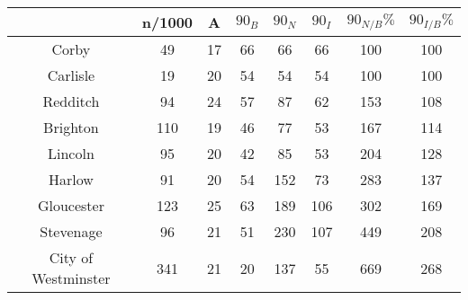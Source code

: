 \begin{tabular}{c|ccccccc}
& n/1000 & A & $90_{B}$ & $90_{N}$ & $90_{I}$ & $90_{N/B}\%$ & $90_{I/B}\%$ \\
\hline
Corby & 49 & 17 & 66 & 66 & 66 & 100 & 100 \\
Carlisle & 19 & 20 & 54 & 54 & 54 & 100 & 100 \\
Redditch & 94 & 24 & 57 & 87 & 62 & 153 & 108 \\
Brighton & 110 & 19 & 46 & 77 & 53 & 167 & 114 \\
Lincoln & 95 & 20 & 42 & 85 & 53 & 204 & 128 \\
Harlow & 91 & 20 & 54 & 152 & 73 & 283 & 137 \\
Gloucester & 123 & 25 & 63 & 189 & 106 & 302 & 169 \\
Stevenage & 96 & 21 & 51 & 230 & 107 & 449 & 208 \\
City of Westminster & 341 & 21 & 20 & 137 & 55 & 669 & 268 \\
\end{tabular}
